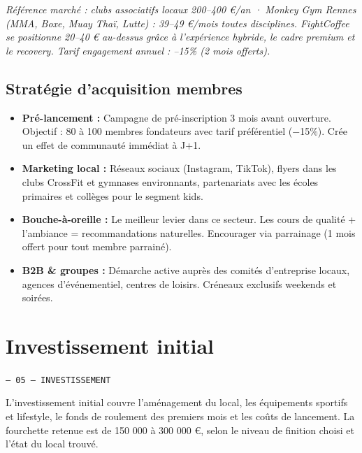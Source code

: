 \documentclass[11pt, a4paper]{article}
\newcommand{\eyebrow}[1]{%
  \vspace{4pt}
  {\small\color{fc-ink3}\texttt{— #1}}
  \vspace{2pt}
}
\begin{document}
\vspace{8pt}
{\small\color{fc-ink3}\textit{Référence marché : clubs associatifs locaux 200–400 €/an · Monkey Gym Rennes (MMA, Boxe, Muay Thaï, Lutte) : 39–49 €/mois toutes disciplines. FightCoffee se positionne 20–40 € au-dessus grâce à l'expérience hybride, le cadre premium et le recovery. Tarif engagement annuel : –15\% (2 mois offerts).}}

\subsection{Stratégie d'acquisition membres}

\begin{itemize}
  \item \textbf{Pré-lancement :} Campagne de pré-inscription 3 mois avant ouverture. Objectif : 80 à 100 membres fondateurs avec tarif préférentiel (−15\%). Crée un effet de communauté immédiat à J+1.
  \item \textbf{Marketing local :} Réseaux sociaux (Instagram, TikTok), flyers dans les clubs CrossFit et gymnases environnants, partenariats avec les écoles primaires et collèges pour le segment kids.
  \item \textbf{Bouche-à-oreille :} Le meilleur levier dans ce secteur. Les cours de qualité + l'ambiance = recommandations naturelles. Encourager via parrainage (1 mois offert pour tout membre parrainé).
  \item \textbf{B2B \& groupes :} Démarche active auprès des comités d'entreprise locaux, agences d'événementiel, centres de loisirs. Créneaux exclusifs weekends et soirées.
\end{itemize}

\section{Investissement initial}
\eyebrow{05 — INVESTISSEMENT}

L'investissement initial couvre l'aménagement du local, les équipements sportifs et lifestyle, le fonds de roulement des premiers mois et les coûts de lancement. La fourchette retenue est de 150 000 à 300 000 €, selon le niveau de finition choisi et l'état du local trouvé.
\end{document}
